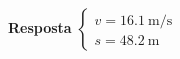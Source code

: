 
\textbf{Resposta}
$
\begin{cases}
	v=\SI{16.1}{\meter/\second}\\
	s=\SI{48.2}{\meter}
\end{cases}
$